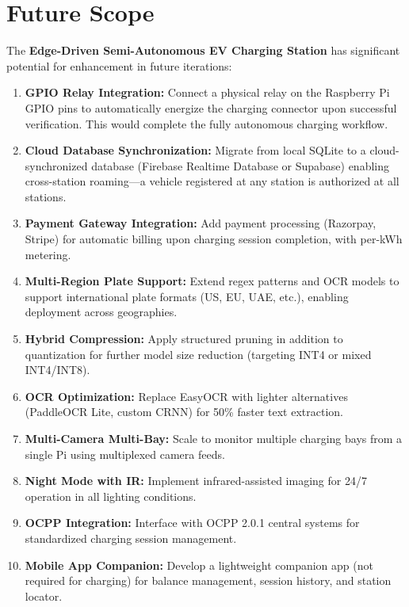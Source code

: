 \documentclass[11pt]{report}
\begin{document}
\chapter{Future Scope}
The \textbf{Edge-Driven Semi-Autonomous EV Charging Station} has significant potential for enhancement in future iterations:

\begin{enumerate}
    \item \textbf{GPIO Relay Integration:} Connect a physical relay on the Raspberry Pi GPIO pins to automatically energize the charging connector upon successful verification. This would complete the fully autonomous charging workflow.
    \item \textbf{Cloud Database Synchronization:} Migrate from local SQLite to a cloud-synchronized database (Firebase Realtime Database or Supabase) enabling cross-station roaming---a vehicle registered at any station is authorized at all stations.
    \item \textbf{Payment Gateway Integration:} Add payment processing (Razorpay, Stripe) for automatic billing upon charging session completion, with per-kWh metering.
    \item \textbf{Multi-Region Plate Support:} Extend regex patterns and OCR models to support international plate formats (US, EU, UAE, etc.), enabling deployment across geographies.
    \item \textbf{Hybrid Compression:} Apply structured pruning in addition to quantization for further model size reduction (targeting INT4 or mixed INT4/INT8).
    \item \textbf{OCR Optimization:} Replace EasyOCR with lighter alternatives (PaddleOCR Lite, custom CRNN) for 50\% faster text extraction.
    \item \textbf{Multi-Camera Multi-Bay:} Scale to monitor multiple charging bays from a single Pi using multiplexed camera feeds.
    \item \textbf{Night Mode with IR:} Implement infrared-assisted imaging for 24/7 operation in all lighting conditions.
    \item \textbf{OCPP Integration:} Interface with OCPP 2.0.1 central systems for standardized charging session management.
    \item \textbf{Mobile App Companion:} Develop a lightweight companion app (not required for charging) for balance management, session history, and station locator.
\end{enumerate}
\end{document}

